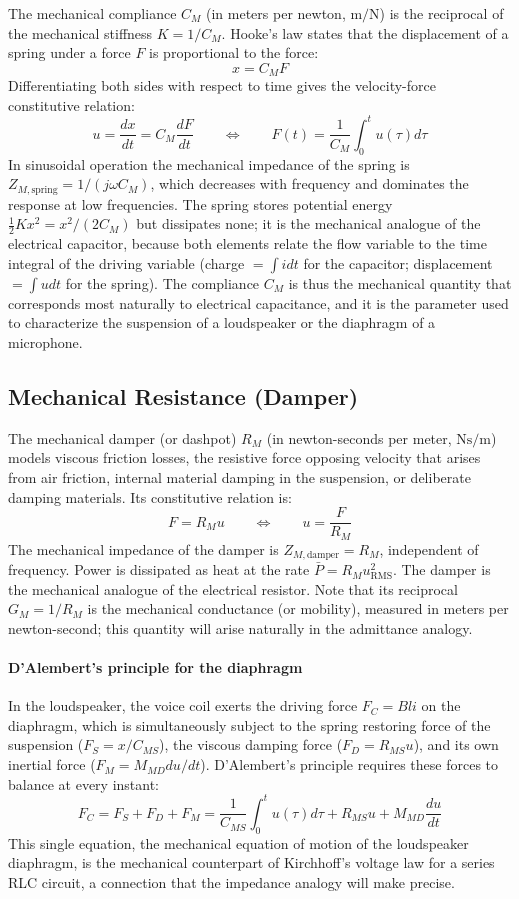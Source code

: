 The mechanical compliance \(C_M\) (in meters per newton, \(\si{\meter\per\newton}\)) is the reciprocal of the mechanical stiffness \(K = 1/C_M\). Hooke's law states that the displacement of a spring under a force \(F\) is proportional to the force:
\[
x = C_M F
\]
Differentiating both sides with respect to time gives the velocity-force constitutive relation:
\[
u = \frac{dx}{dt} = C_M \frac{dF}{dt}
\qquad\Leftrightarrow\qquad
F(t) = \frac{1}{C_M}\int_0^t u(\tau) d\tau
\]
In sinusoidal operation the mechanical impedance of the spring is \(Z_{M,\text{spring}} = 1/(j\omega C_M)\), which decreases with frequency and dominates the response at low frequencies. The spring stores potential energy \(\frac{1}{2}K x^2 = x^2/(2C_M)\) but dissipates none; it is the mechanical analogue of the electrical capacitor, because both elements relate the flow variable to the time integral of the driving variable (charge \(= \int i dt\) for the capacitor; displacement \(= \int u dt\) for the spring). The compliance \(C_M\) is thus the mechanical quantity that corresponds most naturally to electrical capacitance, and it is the parameter used to characterize the suspension of a loudspeaker or the diaphragm of a microphone.

\subsection{Mechanical Resistance (Damper)}
\label{ssc:523}

The mechanical damper (or dashpot) \(R_M\) (in newton-seconds per meter, \(\si{\newton\second\per\meter}\)) models viscous friction losses, the resistive force opposing velocity that arises from air friction, internal material damping in the suspension, or deliberate damping materials. Its constitutive relation is:
\[
F = R_M u
\qquad\Leftrightarrow\qquad
u = \frac{F}{R_M}
\]
The mechanical impedance of the damper is \(Z_{M,\text{damper}} = R_M\), independent of frequency. Power is dissipated as heat at the rate \(\bar P = R_M u_{\mathrm{RMS}}^2\). The damper is the mechanical analogue of the electrical resistor. Note that its reciprocal \(G_M = 1/R_M\) is the mechanical conductance (or mobility), measured in meters per newton-second; this quantity will arise naturally in the admittance analogy.

\paragraph{D'Alembert's principle for the diaphragm} In the loudspeaker, the voice coil exerts the driving force \(F_C = Bl i\) on the diaphragm, which is simultaneously subject to the spring restoring force of the suspension (\(F_S = x/C_{MS}\)), the viscous damping force (\(F_D = R_{MS} u\)), and its own inertial force (\(F_M = M_{MD} du/dt\)). D'Alembert's principle requires these forces to balance at every instant:
\[
F_C = F_S + F_D + F_M
= \frac{1}{C_{MS}}\int_0^t u(\tau) d\tau + R_{MS} u + M_{MD} \frac{du}{dt}
\]
This single equation, the mechanical equation of motion of the loudspeaker diaphragm, is the mechanical counterpart of Kirchhoff's voltage law for a series RLC circuit, a connection that the impedance analogy will make precise.

